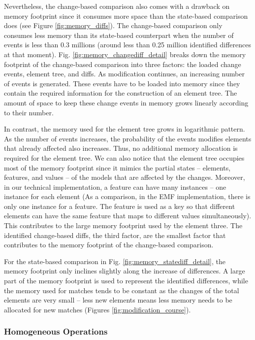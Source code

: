 \documentclass{jot}
\begin{document}
Nevertheless, the change-based comparison also comes with a drawback on memory footprint since it consumes more space than the state-based comparison does (see Figure \ref{fig:memory_diffs}). The change-based comparison only consumes less memory than its state-based counterpart when the number of events is less than 0.3 millions (around less than 0.25 million identified differences at that moment). Fig. \ref{fig:memory_changediff_detail} breaks down the memory footprint of the change-based comparison into three factors: the loaded change events, element tree, and diffs. As modification continues, an increasing number of events is generated. These events have to be loaded into memory since they contain the required information for the construction of an element tree. The amount of space to keep these change events in memory grows linearly according to their number. 

In contrast, the memory used for the element tree grows in logarithmic pattern. As the number of events increases, the probability of the events modifies elements that already affected also increases. Thus, no additional memory allocation is required for the element tree. We can also notice that the element tree occupies most of the memory footprint since it mimics the partial states -- elements, features, and values -- of the models that are affected by the changes. Moreover, in our technical implementation, a feature can have many instances -- one instance for each element (As a comparison, in the EMF implementation, there is only one instance for a feature. The feature is used as a key so that different elements can have the same feature that maps to different values simultaneously). This contributes to the large memory footprint used by the element three. The identified change-based diffs, the third factor, are the smallest factor that contributes to the memory footprint of the change-based comparison. 

For the state-based comparison in Fig. \ref{fig:memory_statediff_detail}, the memory footprint only inclines slightly along the increase of differences. A large part of the memory footprint is used to represent the identified differences, while the memory used for matches tends to be constant as the changes of the total elements are very small -- less new elements means less memory needs to be allocated for new matches (Figures \ref{fig:modification_course}). 

\subsubsection{Homogeneous Operations}
\label{sec:homogeneous-operation}
\end{document}
